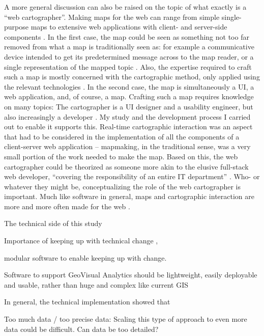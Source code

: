 A more general discussion can also be raised on the topic of what exactly is
a \enquote{web cartographer}.
Making maps for the web can range from simple
single-purpose maps to extensive web applications with
client- and server-side components \parencite{vee2017, mai2017}.
In the first case,
the map could be seen as something not too far removed from
what a map is traditionally seen as: for example a communicative
device intended to get its predetermined message across to the map reader,
or a single representation of the mapped topic \parencite{kol1969, mac2004}.
Also, the expertise required to craft such a map is mostly concerned with
the cartographic method, only applied using the relevant technologies \parencite{rot2021}.
In the second case,
the map is simultaneously a UI, a web application, and, of course, a map.
Crafting such a map requires knowledge on many topics:
The cartographer is a UI designer and a usability engineer,
but also increasingly a developer \parencite{rot2017, mai2017}.
My study and the development process I carried out to enable it supports this.
Real-time cartographic interaction was an aspect that had to be considered
in the implementation of all the components of a client-server web application --
mapmaking, in the traditional sense, was a very small portion of the work
needed to make the map.
Based on this,
the web cartographer could be theorized as
someone more akin to the elusive full-stack web developer,
\enquote{covering the responsibility of an entire IT
department} \parencite[p.~370]{tai2021}.
Who- or whatever they might be, conceptualizing the role of the web cartographer is important.
Much like software in general, maps and cartographic interaction
are more and more often made for the web \parencite{tai2017, rot2021, rot2014, vee2017}.

The technical side of this study





Importance of keeping up with technical change \parencite{rot2014},

modular software to enable keeping up with change.

Software to support GeoVisual Analytics should be lightweight, easily %
deployable and usable, rather than huge and complex like current GIS


In general, the technical implementation showed that


Too much data / too precise data:
Scaling this type of approach to even more data could be difficult.
Can data be too detailed?

